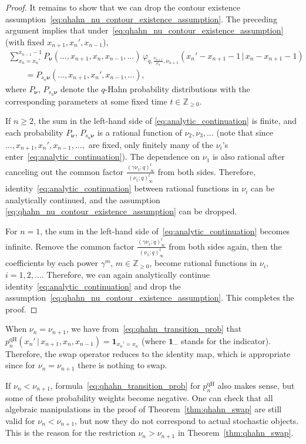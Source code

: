 \documentclass[11pt]{article}
\numberwithin{equation}{section}
\numberwithin{equation}{section}
\begin{document}
\begin{proof}
	

	It remains to show that we can drop the contour
	existence assumption~\eqref{eq:qhahn_nu_contour_existence_assumption}.
	The preceding argument implies that
	under~\eqref{eq:qhahn_nu_contour_existence_assumption} (with fixed $x_{n+1},x_n',x_{n-1}$),
	\begin{gather}
		\sum_{x_n=x_n'}^{x_{n-1}-1}
		P_{\boldsymbol\nu}(\ldots,x_{n+1},x_n,x_{n-1},\ldots )\,
		\varphi_{q,\frac{\nu_{n+1}}{\nu_n},\nu_{n+1}}(x_n'-x_{n+1}-1\,|\, x_n-x_{n+1}-1)\nonumber
		\\ \qquad
{}=		P_{s_n\boldsymbol\nu}(\ldots, x_{n+1},x_{n}',x_{n-1},\ldots ),
		\label{eq:analytic_continuation}
	\end{gather}
	where $P_{\boldsymbol\nu}$, $P_{s_n\boldsymbol\nu}$ denote the
	$q$-Hahn probability distributions
	with the corresponding parameters
	at some fixed time $t\in \mathbb{Z}_{\ge0}$.
	
	If $n\ge2$, the sum in the left-hand side of
	\eqref{eq:analytic_continuation}
	is finite, and each probability $P_{\boldsymbol\nu}$,
	$P_{s_n\boldsymbol\nu}$ is a rational function of $\nu_2,\nu_3,\ldots $
	(note that since $\ldots,x_{n+1},x_n',x_{n-1},\ldots, $ are
	fixed, only finitely many of the $\nu_i$'s
	enter~\eqref{eq:analytic_continuation}).
	The dependence on $\nu_1$ is also rational after canceling out the common
	factor $\frac{(\gamma \nu_1;q)_\infty^t}{(\nu_1;q)_\infty^t}$
	from both sides. Therefore, identity~\eqref{eq:analytic_continuation}
	between rational functions in $\nu_i$ can be analytically continued,
	and the assumption
	\eqref{eq:qhahn_nu_contour_existence_assumption} can be dropped.

	For $n=1$, the sum in the left-hand side of~\eqref{eq:analytic_continuation}
	becomes infinite. Remove the
	common factor
	$\frac{(\gamma \nu_1;q)_\infty^t}{(\nu_1;q)_\infty^t}$
	from both sides again,
	then the coefficients by each power
	$\gamma^m$, $m\in \mathbb{Z}_{\ge0}$,
	become rational functions in $\nu_i$, $i=1,2,\ldots $. Therefore,
	we can again analytically continue identity~\eqref{eq:analytic_continuation}
	and drop the assumption~\eqref{eq:qhahn_nu_contour_existence_assumption}.
	This completes the proof.
\end{proof}

\begin{Remark}
	When $\nu_n=\nu_{n+1}$,
	we have from~\eqref{eq:qhahn_transition_prob}
	that $p_n^{\mathrm{qH}}(x_n'\,|\, x_{n+1},x_n,x_{n-1})=\mathbf{1}_{x_n'=x_n}$
	(where $\mathbf{1}_{\cdots}$ stands for the indicator).
	Therefore, the swap operator
	reduces to the identity map, which is appropriate since
	for $\nu_n=\nu_{n+1}$
	there is nothing to swap.

	If $\nu_n<\nu_{n+1}$,
	formula~\eqref{eq:qhahn_transition_prob} for $p_n^{\mathrm{qH}}$ also
	makes sense, but some of these probability weights become negative.
	One can check that
	all algebraic manipulations in the proof of Theorem~\ref{thm:qhahn_swap}
	are still valid for $\nu_n<\nu_{n+1}$,
	but now they do not correspond to actual stochastic objects.
	This is the reason for the restriction $\nu_n>\nu_{n+1}$ in
	Theorem~\ref{thm:qhahn_swap}.
\end{Remark}
\end{document}
